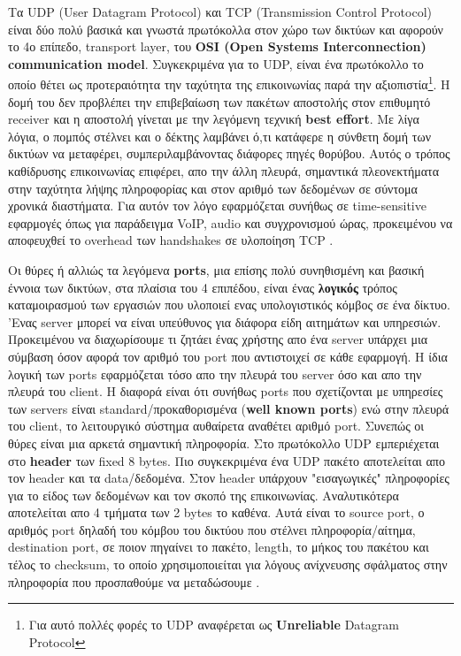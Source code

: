 \documentclass[hidelinks, 12pt, a4paper]{article}
\begin{document}
Τα UDP (User Datagram Protocol) και TCP (Transmission Control Protocol) είναι δύο πολύ βασικά και γνωστά πρωτόκολλα στον χώρο των δικτύων και αφορούν το 4ο επίπεδο, transport layer, του \textbf{OSI (Open Systems Interconnection) communication model}. Συγκεκριμένα για το UDP, είναι ένα πρωτόκολλο το οποίο θέτει ως προτεραιότητα την ταχύτητα της επικοινωνίας παρά την αξιοπιστία\footnote{Για αυτό πολλές φορές το UDP αναφέρεται ως \textbf{Unreliable} Datagram Protocol}. Η δομή του δεν προβλέπει την επιβεβαίωση των πακέτων αποστολής στον επιθυμητό receiver και η αποστολή γίνεται με την λεγόμενη τεχνική \textbf{best effort}. Με λίγα λόγια, ο πομπός στέλνει και ο δέκτης λαμβάνει ό,τι κατάφερε η σύνθετη δομή των δικτύων να μεταφέρει, συμπεριλαμβάνοντας διάφορες πηγές θορύβου. Αυτός ο τρόπος καθίδρυσης επικοινωνίας επιφέρει, απο την άλλη πλευρά, σημαντικά πλεονεκτήματα στην ταχύτητα λήψης πληροφορίας και στον αριθμό των δεδομένων σε σύντομα χρονικά διαστήματα. Για αυτόν τον λόγο εφαρμόζεται συνήθως σε time-sensitive εφαρμογές όπως για παράδειγμα VoIP, audio και συγχρονισμού ώρας, προκειμένου να αποφευχθεί το overhead των handshakes σε υλοποίηση TCP \cite{searchnetworking, wiki_udp}.

Οι θύρες ή αλλιώς τα λεγόμενα \textbf{ports}, μια επίσης πολύ συνηθισμένη και βασική έννοια των δικτύων, στα πλαίσια του 4 επιπέδου, είναι ένας \textbf{λογικός} τρόπος καταμοιρασμού των εργασιών που υλοποιεί ενας υπολογιστικός κόμβος σε ένα δίκτυο. 'Ενας server μπορεί να είναι υπεύθυνος για διάφορα είδη αιτημάτων και υπηρεσιών. Προκειμένου να διαχωρίσουμε τι ζητάει ένας χρήστης απο ένα server υπάρχει μια σύμβαση όσον αφορά τον αριθμό του port που αντιστοιχεί σε κάθε εφαρμογή. Η ίδια λογική των ports εφαρμόζεται τόσο απο την πλευρά του server όσο και απο την πλευρά του client. Η διαφορά είναι ότι συνήθως ports που σχετίζονται με υπηρεσίες των servers είναι standard/προκαθορισμένα (\textbf{well known ports}) ενώ στην πλευρά του client, το λειτουργικό σύστημα αυθαίρετα αναθέτει αριθμό port. Συνεπώς οι θύρες είναι μια αρκετά σημαντική πληροφορία. Στο πρωτόκολλο UDP εμπεριέχεται στο \textbf{header} των fixed 8 bytes. Πιο συγκεκριμένα ένα UDP πακέτο αποτελείται απο τον header και τα data/δεδομένα. Στον header υπάρχουν "εισαγωγικές" πληροφορίες για το είδος των δεδομένων και τον σκοπό της επικοινωνίας. Αναλυτικότερα αποτελείται απο 4 τμήματα των 2 bytes το καθένα. Αυτά είναι το source port, ο αριθμός port δηλαδή του κόμβου του δικτύου που στέλνει πληροφορία/αίτημα, destination port, σε ποιον πηγαίνει το πακέτο, length, το μήκος του πακέτου και τέλος το checksum, το οποίο χρησιμοποιείται για λόγους ανίχνευσης σφάλματος στην πληροφορία που προσπαθούμε να μεταδώσουμε \cite{wiki_udp, gfgudp}.
\end{document}
